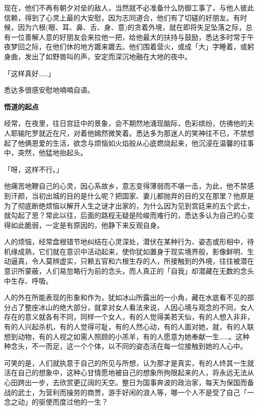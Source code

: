 \documentclass[twoside,openany]{book}
\newcommand{\mt}[1]{\textbullet \textbf{#1}}
\begin{document}
现在，他们不再有朝夕对垒的敌人，当然就不必准备什么防御工事了，与他人彼此信赖，得到了心灵上最的大安慰，因为志同道合，他们有了切磋的好朋友。有时候，因为六根(眼、耳、鼻、舌、身、意)的贪着外境，就在即将失足坠落之际，总有一位善解人意的好朋友会来拉他一把，给他最大的扶持与鼓励，悉达多时常于午夜梦回之际，在他们休的地方踱来踱去。他们围着营火，或成「大」字睡着，或躬身曲，发出了如野兽叫的声，安定而深沉地融在大地的夜中。

「这样真好……」

悉达多很感安慰地喃喃自语。

\mt{悟道的起点}

经常，在夜里，往日宫廷中的景象，会不期然地涌现脑际，色彩缤纷，彷彿他的夫人耶输陀罗就近在尺，对着他嫣然微笑着。悉达多为那迷人的笑神往不已，不禁想起了他俩恩爱的生活，欲念与烦恼如火焰般从心底燃烧起来，他沉浸在温馨的往事中，突然，他猛地抬起头。

「呀，这样不行。」

他痛苦地鞭自己的心灵，因心系故乡，意志变得薄弱而不堪一击，为此，他不禁感到汗颜，当初出城的目的是什么呢？把国家、妻儿都抛弃的目的又在那里？他原是为了彻底断绝烦恼以解开人生之谜才出家的，为什么因为见到宫廷来的五个武士，就勾起了思？常此以往，后面的路程无疑是险峻而难行的，悉达多认为自己的心变得如此脆弱，一定是有原因的，他静下来反观自身。

人的烦恼，经常盘根错节地纠结在心灵深处，潜伏在某种行为、姿态或形相中，待机缘成熟，它们就在意识中活动起来，使你犹如置身于现实境界般，影像鲜明、生动逼真，令人莫辨虚实，只赖五官和六根生存的人，所接触到的外境，往往被潜在意识所蒙蔽，人们易忽略行为前的念头，而人真正的「自我」却潜藏在无数的念头中生存、呼吸。

人的外在所能表现的形象和作为，犹如冰山所露出的一小角，藏在水底看不见的部分占了整座冰山的绝大部分，就拿对女人看法来说，人因心境与观念的不同，女人存在的意义就各有不同，同样一个女人，有的人觉得美若天仙，有的人想入非非，有的人兴起杀机，有的人觉得可耻，有的人然心动，有的人面对她，就，有的人联想到动物，有的人视之如需人照顾的小羔羊，有的人愿意为她奉献一生……。这种种念头，不一而足，这一个个体，以不同的姿态活在每一位接触到她的人心中。

可笑的是，人们就执意于自己的所见与所想，认为那才是真实，有的人终其一生就活在自己的想象中，这种心甘情愿地被自己的想象所拘限起来的人，将永远无法从心田跨出一步，去欣赏更辽阔的天空。整日为国事奔波的政治家，每天为保国而备战的武士，为营利而操劳的商贾，游手好闲的浪人等，哪一个人不是受了自己「一念之动」的驱使而度过他的一生？
\end{document}
